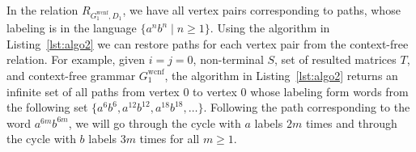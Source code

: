 In the relation $R_{G_1^{\text{wcnf}}, D_1}$, we have all vertex pairs corresponding to paths, whose labeling is in the language $\{a^n b^n \mid n \geq 1\}$. Using the algorithm in Listing~\ref{lst:algo2} we can restore paths for each vertex pair from the context-free relation. For example, given $i=j=0$, non-terminal $S$, set of resulted matrices $T$, and context-free grammar $G_1^{\text{wcnf}}$, the algorithm in Listing~\ref{lst:algo2} returns an infinite set of all paths from vertex 0 to vertex 0 whose labeling form words from the following set $\{a^6 b^6, a^{12} b^{12}, a^{18} b^{18}, \ldots \}$. Following the path corresponding to the word $a^{6m} b^{6m}$, we will go through the cycle with $a$ labels $2m$ times and through the cycle with $b$ labels $3m$ times for all $m \geq 1$.